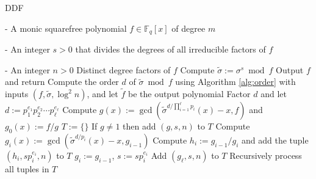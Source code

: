 \documentclass{article}
\theoremstyle{plain}
\theoremstyle{definition}
\newcommand{\algbox}[1]{
	\begin{tcolorbox}[width = 0.8\textwidth, colback = white, arc = 2pt, boxrule = 0.5pt] 
		#1 
	\end{tcolorbox}
}
\def\F{\ensuremath{\mathbb{F}}}
\begin{document}
\begin{algorithm}[t]
	\caption{DDF}
	\label{alg:ddf}
	\centering
	\algbox{
	\begin{algorithmic}[1]
		\Require 
		\item[-] A monic squarefree polynomial $f \in \F_q[x]$ of degree $m$
		\item[-] An integer $s > 0$ that divides the degrees of all irreducible factors of $f$
		\item[-] An integer $n > 0$
		\Ensure Distinct degree factors of $f$
		\State\label{step:sigma-s}Compute $\tilde{\sigma} := \sigma^s \bmod f$
		\If {$\tilde{\sigma} = $ id}
			\State Output $f$ and return
		\EndIf
		\State\label{step:order}Compute the order $d$ of $\tilde{\sigma} \bmod f$ using Algorithm 
		\ref{alg:order} with inputs $(f, \tilde{\sigma}, \log^2n)$, and let $\tilde{f}$ be the 
		output polynomial
		\State\label{step:factor-d}Factor $d$ and let $d := p_1^{e_1} p_2^{e_2} \cdots 
		p_\ell^{e_\ell}$
		\State\label{step:gcd-first}Compute $g(x) := \gcd(\tilde{\sigma}^{d / \prod_{i = 1}^\ell 
		p_i}(x) - x, f)$ and $g_0(x) := f / g$
		\State $T := \{\}$
		\State If $g \ne 1$ then add $(g, s, n)$ to $T$
		\For {$i = 1$ to $\ell$ }\label{step:for-ddf}
			\State Compute $g_i(x) := \gcd(\tilde{\sigma}^{d / p_i}(x) - x, g_{i - 1})$
			\If {$g_i \ne 1$} 
				\State Compute $h_i := g_{i - 1} / g_i$ and add the tuple $(h_i, sp_i^{e_i}, n)$ to 
				$T$
			\Else
				\State $g_i := g_{i - 1}$, $s := sp_i^{e_i}$
			\EndIf
		\EndFor
		\State Add $(g_\ell, s, n)$ to $T$
		\State Recursively process all tuples in $T$
	\end{algorithmic}}
\end{algorithm}
\end{document}
